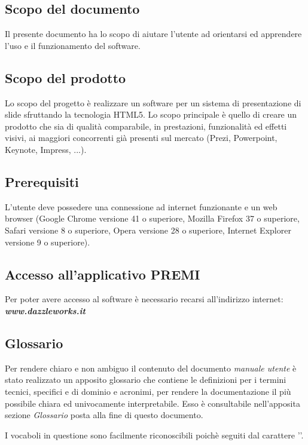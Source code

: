 \subsection{Scopo del documento}
Il presente documento ha lo scopo di aiutare l'utente ad orientarsi ed apprendere l'uso e il funzionamento del software.

\subsection{Scopo del prodotto}
Lo scopo del progetto è realizzare un software per un sistema di presentazione di slide sfruttando la tecnologia HTML5. Lo scopo principale è quello di creare un prodotto che sia di qualità comparabile, in prestazioni, funzionalità ed effetti visivi, ai maggiori concorrenti già presenti sul mercato (Prezi, Powerpoint, Keynote, Impress, ...).

\subsection{Prerequisiti}
L'utente deve possedere una connessione ad internet funzionante e un web browser (Google Chrome versione 41 o superiore, Mozilla Firefox 37 o superiore, Safari versione 8 o superiore, Opera versione 28 o superiore, Internet Explorer versione 9 o superiore).

\subsection{Accesso all'applicativo PREMI}
Per poter avere accesso al software è necessario recarsi all'indirizzo internet: \textbf{\textit{www.dazzleworks.it}}

\subsection{Glossario}
Per rendere chiaro e non ambiguo il contenuto del documento \textit{manuale utente} è stato realizzato un apposito glossario che contiene le definizioni per i termini tecnici, specifici e di dominio e acronimi, per rendere la documentazione il più possibile chiara ed univocamente interpretabile. Esso è consultabile nell'apposita sezione \textit{Glossario} posta alla fine di questo documento.

\noindent I vocaboli in questione sono facilmente riconoscibili poichè seguiti dal carattere ''.


